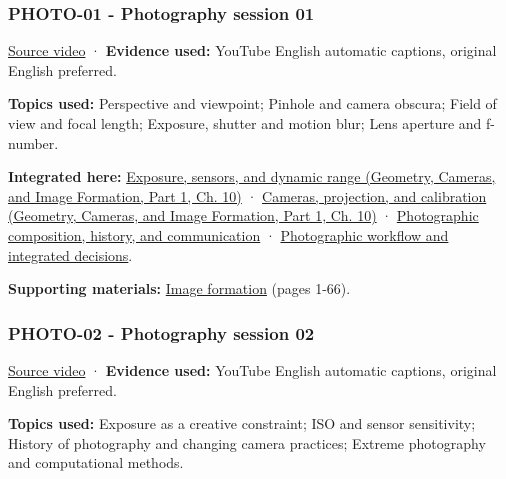\subsubsection{PHOTO-01 - Photography session 01}\label{04-visual-computing-ii-ch036-photo-01---photography-session-01}

\hypertarget{04-visual-computing-ii-ch036-photo-01---photography-session-01}{}

\href{https://www.youtube.com/watch?v=y7HrM-fk_Rc}{Source video} · \textbf{Evidence used:} YouTube English automatic captions, original English preferred.

\textbf{Topics used:} Perspective and viewpoint; Pinhole and camera obscura; Field of view and focal length; Exposure, shutter and motion blur; Lens aperture and f-number.

\textbf{Integrated here:} \href{../03-Geometry-Cameras-and-Image-Formation-P01/main.pdf\#nameddest=03-visual-computing-i-ch003-exposure-sensors-and-dynamic-range}{Exposure, sensors, and dynamic range (Geometry, Cameras, and Image Formation, Part 1, Ch. 10)} · \href{../03-Geometry-Cameras-and-Image-Formation-P01/main.pdf\#nameddest=03-visual-computing-i-ch003-cameras-projection-and-calibration}{Cameras, projection, and calibration (Geometry, Cameras, and Image Formation, Part 1, Ch. 10)} · \hyperref[04-visual-computing-ii-ch034-photographic-composition-history-and-communication]{Photographic composition, history, and communication} · \hyperref[04-visual-computing-ii-ch034-photographic-workflow-and-integrated-decisions]{Photographic workflow and integrated decisions}.

\textbf{Supporting materials:} \href{https://drive.google.com/file/d/0B6w2XfPHEcZYdVd4anZzZTc3aE0/view?usp=sharing}{Image formation} (pages 1-66).

\subsubsection{PHOTO-02 - Photography session 02}\label{04-visual-computing-ii-ch036-photo-02---photography-session-02}

\hypertarget{04-visual-computing-ii-ch036-photo-02---photography-session-02}{}

\href{https://www.youtube.com/watch?v=d_sJFslHQsg}{Source video} · \textbf{Evidence used:} YouTube English automatic captions, original English preferred.

\textbf{Topics used:} Exposure as a creative constraint; ISO and sensor sensitivity; History of photography and changing camera practices; Extreme photography and computational methods.

